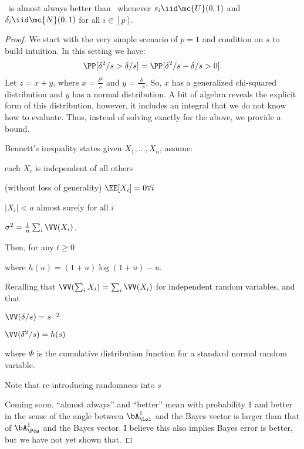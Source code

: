 \documentclass[10pt]{article}
\begin{document}
\begin{conj}
\Lol~is almost always better than \Pca~whenever $s_i \iid \mc{U}(0,1)$ and $\delta_i \iid \mc{N}(0,1)$ for all $i \in [p]$.
\end{conj}
\begin{proof}
We start with the very simple scenario of $p=1$ and condition on $s$ to build intuition.
In this setting we have:
\begin{align}
\PP[ \delta^2 / s > \delta/s ] = \PP[ \delta^2 / s - \delta/s  > 0].  
\end{align}
Let $z= x+y$, where $x= \frac{\delta^2}{s}$  and $y=\frac{\delta}{-s}$.  
So, $x$ has a generalized chi-squared distribution and $y$ has a normal distribution.
A bit of algebra reveals the explicit form of this distribution, however, it includes an integral that we do not know how to evaluate.  Thus, instead of solving exactly for the above, we provide a bound.

Bennett's inequality states given $X_1,\ldots, X_n$, assume:
\begin{compactitem}
\item each $X_i$ is independent of all others
\item (without loss of generality) $\EE[X_i]=0 \forall i$
\item $|X_i|<a$ almost surely for all $i$
\item $\sigma^2 = \frac{1}{n} \sum_i \VV(X_i)$.
\end{compactitem}
Then, for any $t \geq 0$

where $h(u)=(1+u) \log (1+u) - u$.

Recalling that $\VV(\sum_i X_i) = \sum_i \VV(X_i)$ for independent random variables, and that
\begin{compactenum}
\item  $\VV(\delta/s) = s^{-2}$
\item $\VV(\delta^2/s) = h(s)$ 
\end{compactenum}





where $\Phi$ is the cumulative distribution function for a standard normal random variable.  

Note that re-introducing randomness into $s$


Coming soon.  ``almost always'' and ``better'' mean with probability 1 and better in the sense of the angle between $\bA_{\Lol}^1$ and the Bayes vector is larger than that of $\bA_{\Pca}^1$ and the Bayes vector.
I believe this also implies Bayes error is better, but we have not yet shown that.
\end{proof}
\end{document}
